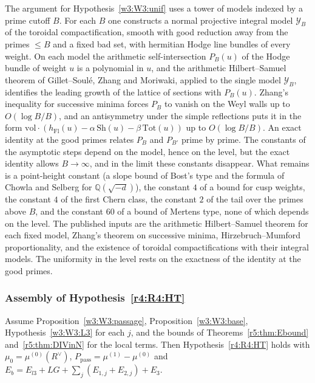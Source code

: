 The argument for Hypothesis~\ref{w3:W3:unif} uses a tower of models indexed by a prime cutoff $B$. For each $B$ one constructs a normal projective integral model $\mathcal Y_B$ of the toroidal compactification, smooth with good reduction away from the primes $\le B$ and a fixed bad set, with hermitian Hodge line bundles of every weight. On each model the arithmetic self-intersection $P_B(u)$ of the Hodge bundle of weight $u$ is a polynomial in $u$, and the arithmetic Hilbert--Samuel theorem of Gillet--Soul\'e, Zhang and Moriwaki, applied to the single model $\mathcal Y_B$, identifies the leading growth of the lattice of sections with $P_B(u)$. Zhang's inequality for successive minima forces $P_B$ to vanish on the Weyl walls up to $O(\log B/B)$, and an antisymmetry under the simple reflections puts it in the form $\mathrm{vol}\cdot(h_{\mathrm{Fl}}(u)-\alpha\,\mathrm{Sh}(u)-\beta\,\mathrm{Tot}(u))$ up to $O(\log B/B)$. An exact identity at the good primes relates $P_B$ and $P_{B'}$ prime by prime. The constants of the asymptotic steps depend on the model, hence on the level, but the exact identity allows $B\to\infty$, and in the limit these constants disappear. What remains is a point-height constant (a slope bound of Bost's type and the formula of Chowla and Selberg for $\mathbb Q(\sqrt{-d})$), the constant $4$ of a bound for cusp weights, the constant $4$ of the first Chern class, the constant $2$ of the tail over the primes above $B$, and the constant $60$ of a bound of Mertens type, none of which depends on the level. The published inputs are the arithmetic Hilbert--Samuel theorem for each fixed model, Zhang's theorem on successive minima, Hirzebruch--Mumford proportionality, and the existence of toroidal compactifications with their integral models.  The uniformity in the level rests on the exactness of the identity at the good primes.

\subsubsection{Assembly of Hypothesis~\ref{r4:R4:HT}}

\begin{theorem}\label{w3:W3:HT}
Assume Proposition~\ref{w3:W3:passage}, Proposition~\ref{w3:W3:base}, Hypothesis~\ref{w3:W3:L3} for each $j$, and the bounds of Theorems~\ref{r5:thm:Ebound} and~\ref{r5:thm:DIVinN} for the local terms. Then Hypothesis~\ref{r4:R4:HT} holds with $\mu_0=\mu^{(0)}(R^\vee)$, $P_{\mathrm{pass}}=\mu^{(1)}-\mu^{(0)}$ and $E_b=E_{l3}+LG+\sum_j(E_{1,j}+E_{2,j})+E_3$.
\end{theorem}

